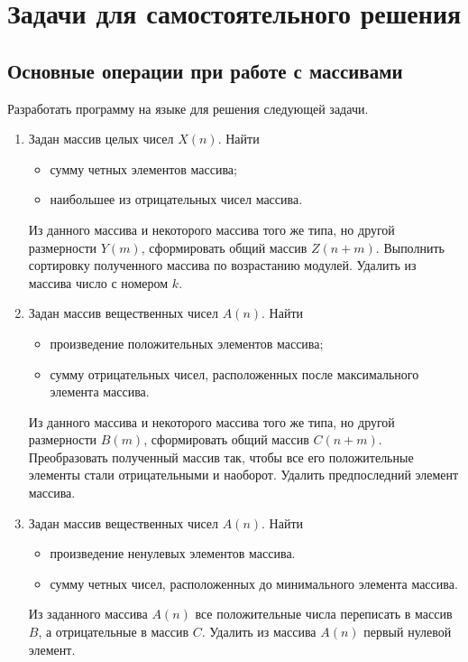 \section[Задачи для самостоятельного решения]{Задачи для самостоятельного решения}
\subsection[Основные операции при работе с массивами]{Основные операции при работе с массивами}
Разработать программу на языке  для решения следующей задачи.

\begin{enumerate}
\item Задан массив целых чисел $X(n)$. Найти
\begin{itemize}
\item сумму четных элементов массива;
\item наибольшее из отрицательных чисел массива.
\end{itemize}

Из данного массива и некоторого массива того же типа, но другой размерности $Y(m)$,
сформировать общий массив $Z(n+m)$. Выполнить сортировку полученного массива по
возрастанию модулей. Удалить из массива число с номером $k$.
\item Задан массив вещественных чисел $A(n)$. Найти 
\begin{itemize}
\item произведение положительных элементов массива;
\item сумму отрицательных чисел, расположенных после максимального элемента массива.
\end{itemize}

Из данного массива и некоторого массива того же типа, но другой размерности $B(m)$,
сформировать общий массив $C(n+m)$. Преобразовать полученный массив так, чтобы все
его положительные элементы стали отрицательными и наоборот. Удалить предпоследний элемент массива.
\item Задан массив вещественных чисел $A(n)$. Найти
\begin{itemize}
\item произведение ненулевых элементов массива.
\item сумму четных чисел, расположенных до минимального элемента массива.
\end{itemize}

Из заданного массива $A(n)$ все положительные числа переписать в массив $B$, а
отрицательные в массив $C$. Удалить из массива $A(n)$ первый нулевой элемент.


\end{enumerate}
